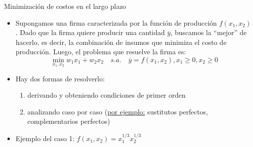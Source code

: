 \documentclass{beamer}
\theoremstyle{definition}
\begin{document}
\begin{frame}{Minimización de costos en el largo plazo}
	\begin{itemize}
		\item Supongamos una firma caracterizada por la funci\'{o}n de producci\'{o}n $f(x_{1},x_{2})$. Dado que la firma quiere producir una cantidad $\overline{y} $, buscamos la ``mejor'' de hacerlo, es decir, la
combinaci\'{o}n de insumos que minimiza el costo de producci\'{o}n. Luego, el problema que resuelve la firma es:
		\begin{equation*}
		\min_{x_{1},x_{2}}w_{1}x_{1}+w_{2}x_{2} \quad s.a. \quad \overline{y} =f(x_{1},x_{2}), x_{1}\geq 0,x_{2}\geq 0
		\end{equation*}
		\item Hay dos formas de resolverlo:
		\begin{enumerate}
		    	    \item derivando y obteniendo condiciones de primer orden
	    \item analizando caso por caso (\underline{por ejemplo:} sustitutos perfectos, complementarios perfectos)
		\end{enumerate}
  \item Ejemplo del caso 1: $f(x_1,x_2)=x_1^{1/3}x_2^{1/3}$
		\end{itemize}

  
		\end{frame}
		
\end{document}

